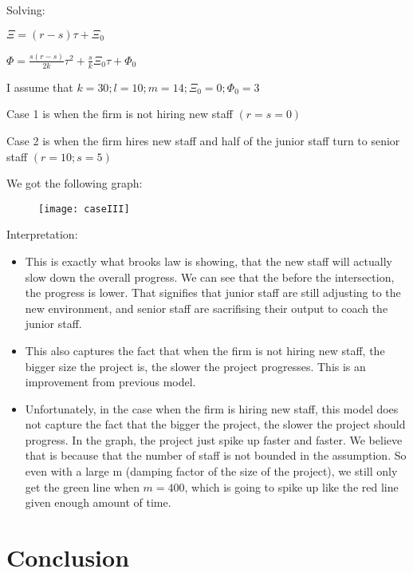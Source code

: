 \documentclass{article}
\newenvironment{atomize}
    {\begin{list} {} {
            \setlength\itemindent{0pt}
            \setlength\leftmargin{10pt}
            \setlength\labelwidth{0pt}
    }}
    {\end{list}}
\begin{document}
\begin{atomize}
\begin{atomize}
					\item Solving: 
							\begin{atomize}
								\item $\Xi = (r-s)\tau + \Xi_{0}$
								\item $\Phi = \frac{s(r-s)}{2k}\tau^{2} + \frac{s}{k}\Xi_{0}\tau + \Phi_{0}$
								\item I assume that $k = 30; l = 10; m = 14; \Xi_{0} = 0; \Phi_{0} = 3$ 
								\item Case 1 is when the firm is not hiring new staff $(r = s =
								0)$
								\item Case 2 is when the firm hires new staff and half of the
								junior staff turn to senior staff $(r=10; s=5)$
                \item We got the following graph:
							\end{atomize}
 		       \item 
    		      \begin{figure}[H]
        	    \centering
          	  \texttt{[image: caseIII]}
         	 \end{figure}

          \item Interpretation:
            \begin{itemize}
							\item This is exactly what brooks law is showing, that the new
							staff will actually slow down the overall progress. We can see
							that the before the intersection, the progress is lower. That
							signifies that junior staff are still adjusting to the new
							environment, and senior staff are sacrifising their output to
							coach the junior staff. 

							\item This also captures the fact that when the firm is not hiring
							new staff, the bigger size the project is, the slower the project
							progresses. This is an improvement from previous model.

							\item Unfortunately, in the case when the firm is hiring new
							staff, this model does not capture the fact that the bigger the
							project, the slower the project should progress. In the graph, the
							project just spike up faster and faster. We believe that is
							because that the number of staff is not bounded in the assumption.
							So even with a large m (damping factor of the size of the
							project), we still only get the green line when $m=400$, which is
							going to spike up like the red line given enough amount of time. 

            \end{itemize}


				\end{atomize}
			
		\end{atomize}

  \section*{Conclusion}
		
\end{document}
